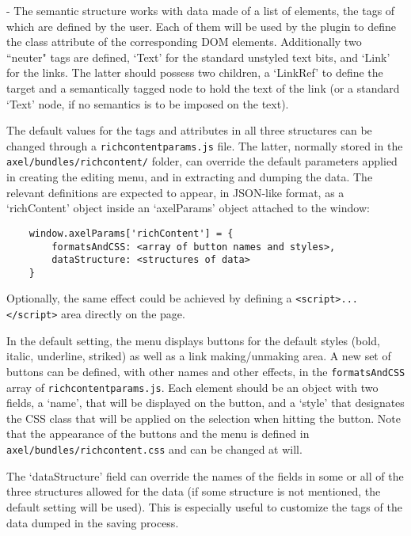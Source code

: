 \documentclass[11pt,a4paper]{article}
\begin{document}
- The semantic structure works with data made of a list of elements, the tags of which are defined by the user. Each of them will be used by the plugin to define the class attribute of the corresponding DOM elements. Additionally two ``neuter" tags are defined, `Text' for the standard unstyled text bits, and `Link' for the links. The latter should possess two children, a `LinkRef' to define the target and a semantically tagged node to hold the text of the link (or a standard `Text' node, if no semantics is to be imposed on the text).

The default values for the tags and attributes in all three structures can be changed through a \texttt{richcontentparams.js} file. The latter, normally stored in the \texttt{axel/bundles/richcontent/} folder, can override the default parameters applied in creating the editing menu, and in extracting and dumping the data. The relevant definitions are expected to appear, in JSON-like format, as a `richContent' object inside an `axelParams' object attached to the window: 

\begin{verbatim}
    window.axelParams['richContent'] = {
        formatsAndCSS: <array of button names and styles>, 
        dataStructure: <structures of data>
    }
\end{verbatim}

Optionally, the same effect could be achieved by defining a \verb?<script>...</script>? area directly on the page.

In the default setting, the menu displays buttons for the default styles (bold, italic, underline, striked) as well as a link making/unmaking area. A new set of buttons can be defined, with other names and other effects, in the \texttt{formatsAndCSS} array of \texttt{richcontentparams.js}. Each element should be an object with two fields, a `name', that will be displayed on the button, and a `style' that designates the CSS class that will be applied on the selection when hitting the button. Note that the appearance of the buttons and the menu is defined in \texttt{axel/bundles/richcontent.css} and can be changed at will.

The `dataStructure' field can override the names of the fields in some or all of the three structures allowed for the data (if some structure is not mentioned, the default setting will be used). This is especially useful to customize the tags of the data dumped in the saving process. 

\end{document}
